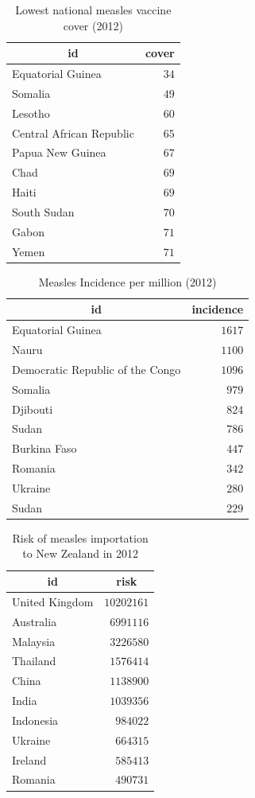 \documentclass{article}
\begin{document}
\begin{table}
\caption{Lowest national measles vaccine cover (2012)}
\begin{center}
\begin{tabular}{lr}
\hline\hline
\multicolumn{1}{c}{id}&\multicolumn{1}{c}{cover}\tabularnewline
\hline
Equatorial Guinea&$34$\tabularnewline
Somalia&$49$\tabularnewline
Lesotho&$60$\tabularnewline
Central African Republic&$65$\tabularnewline
Papua New Guinea&$67$\tabularnewline
Chad&$69$\tabularnewline
Haiti&$69$\tabularnewline
South Sudan&$70$\tabularnewline
Gabon&$71$\tabularnewline
Yemen&$71$\tabularnewline
\hline
\end{tabular}\end{center}\end{table}

\begin{table}
\caption{Measles Incidence per million (2012)}
\begin{center}
\begin{tabular}{lr}
\hline\hline
\multicolumn{1}{c}{id}&\multicolumn{1}{c}{incidence}\tabularnewline
\hline
Equatorial Guinea&$1617$\tabularnewline
Nauru&$1100$\tabularnewline
Democratic Republic of the Congo&$1096$\tabularnewline
Somalia&$ 979$\tabularnewline
Djibouti&$ 824$\tabularnewline
Sudan&$ 786$\tabularnewline
Burkina Faso&$ 447$\tabularnewline
Romania&$ 342$\tabularnewline
Ukraine&$ 280$\tabularnewline
Sudan&$ 229$\tabularnewline
\hline
\end{tabular}\end{center}\end{table}

\begin{table}
\caption{Risk of measles importation to New Zealand in 2012}
\begin{center}
\begin{tabular}{lr}
\hline\hline
\multicolumn{1}{c}{id}&\multicolumn{1}{c}{risk}\tabularnewline
\hline
United Kingdom&$10202161$\tabularnewline
Australia&$ 6991116$\tabularnewline
Malaysia&$ 3226580$\tabularnewline
Thailand&$ 1576414$\tabularnewline
China&$ 1138900$\tabularnewline
India&$ 1039356$\tabularnewline
Indonesia&$  984022$\tabularnewline
Ukraine&$  664315$\tabularnewline
Ireland&$  585413$\tabularnewline
Romania&$  490731$\tabularnewline
\hline
\end{tabular}\end{center}\end{table}
\end{document}
